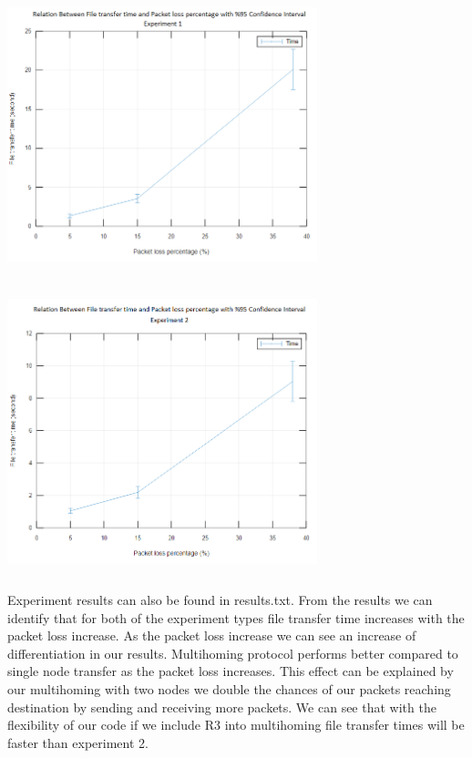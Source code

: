 \documentclass[conference]{IEEEtran}
\begin{document}
\includegraphics[width = 90mm, height = 80mm]{exp1_confidence.png}\\ \qquad \\
\includegraphics[width = 90mm, height = 80mm]{exp2_confidence.png}\\ \qquad \\

Experiment results can also be found in results.txt. From the results we can identify that for both of the experiment types file transfer time increases with the packet loss increase. As the packet loss increase we can see an increase of differentiation in our results. Multihoming protocol performs better compared to single node transfer as the packet loss increases. This effect can be explained by our multihoming with two nodes we double the chances of our packets reaching destination by sending and receiving more packets. We can see that with the flexibility of our code if we include R3 into multihoming file transfer times will be faster than experiment 2. \\ \qquad \\
\end{document}
